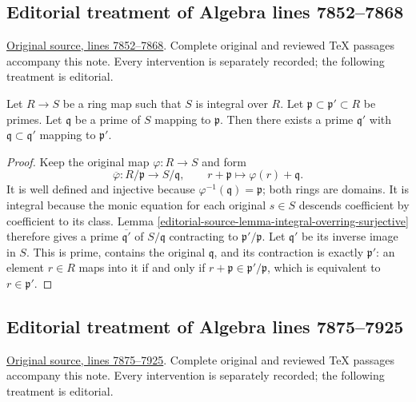 \subsection{Editorial treatment of Algebra lines 7852--7868}

\hypertarget{algebra-context-086}{}

\noindent\href{https://github.com/stacks/stacks-project/blob/a04446e57ec1fbc252a871afcec7752fb2807b14/algebra.tex\#L7852}{Original source, lines 7852--7868}. Complete original and reviewed TeX passages accompany this note. Every intervention is separately recorded; the following treatment is editorial.


\begin{lemma}
\label{editorial-source-lemma-integral-going-up}
Let $R \to S$ be a ring map such that
$S$ is integral over $R$.
Let $\mathfrak p \subset \mathfrak p' \subset R$
be primes. Let $\mathfrak q$ be a prime of $S$ mapping
to $\mathfrak p$. Then there exists a prime $\mathfrak q'$
with $\mathfrak q \subset \mathfrak q'$
mapping to $\mathfrak p'$.
\end{lemma}

\begin{proof}
Keep the original map $\varphi:R\to S$ and form
$$
\overline\varphi:R/\mathfrak p\longrightarrow S/\mathfrak q,
\qquad r+\mathfrak p\longmapsto\varphi(r)+\mathfrak q.
$$
It is well defined and injective because
$\varphi^{-1}(\mathfrak q)=\mathfrak p$; both rings are domains.
It is integral because the monic equation for each original
$s\in S$ descends coefficient by coefficient to its class.
Lemma \ref{editorial-source-lemma-integral-overring-surjective} therefore gives
a prime $\overline{\mathfrak q'}$ of $S/\mathfrak q$ contracting
to $\mathfrak p'/\mathfrak p$. Let $\mathfrak q'$ be its inverse
image in $S$. This is prime, contains the original $\mathfrak q$,
and its contraction is exactly $\mathfrak p'$: an element $r\in R$
maps into it if and only if $r+\mathfrak p\in\mathfrak p'/\mathfrak p$,
which is equivalent to $r\in\mathfrak p'$.
\end{proof}


\subsection{Editorial treatment of Algebra lines 7875--7925}

\hypertarget{algebra-context-087}{}

\noindent\href{https://github.com/stacks/stacks-project/blob/a04446e57ec1fbc252a871afcec7752fb2807b14/algebra.tex\#L7875}{Original source, lines 7875--7925}. Complete original and reviewed TeX passages accompany this note. Every intervention is separately recorded; the following treatment is editorial.


